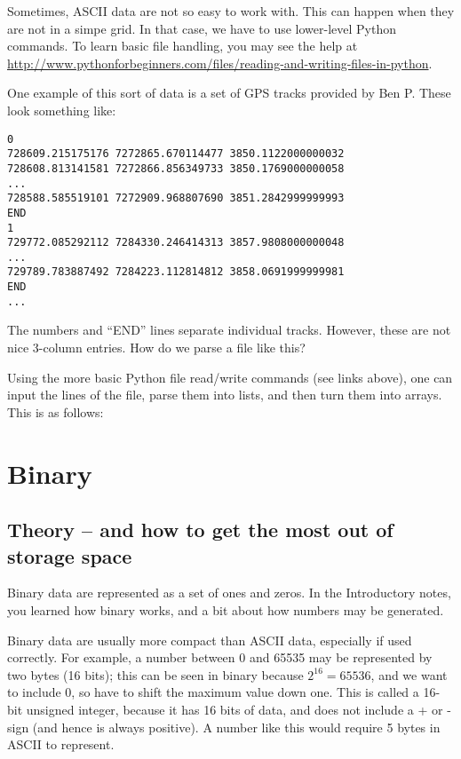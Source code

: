 \documentclass[a4paper,10pt]{scrartcl}
\begin{document}
Sometimes, ASCII data are not so easy to work with. This can happen when they are not in a simpe grid. In that case, we have to use lower-level Python commands. To learn basic file handling, you may see the help at \url{http://www.pythonforbeginners.com/files/reading-and-writing-files-in-python}.

One example of this sort of data is a set of GPS tracks provided by Ben P. These look something like:

\begin{lstlisting}
0
728609.215175176 7272865.670114477 3850.1122000000032
728608.813141581 7272866.856349733 3850.1769000000058
...
728588.585519101 7272909.968807690 3851.2842999999993
END
1
729772.085292112 7284330.246414313 3857.9808000000048
...
729789.783887492 7284223.112814812 3858.0691999999981
END
...
\end{lstlisting}

The numbers and ``END'' lines separate individual tracks. However, these are not nice 3-column entries. How do we parse a file like this?

Using the more basic Python file read/write commands (see links above), one can input the lines of the file, parse them into lists, and then turn them into arrays. This is as follows:



\section{Binary}

\subsection{Theory -- and how to get the most out of storage space}

Binary data are represented as a set of ones and zeros. In the Introductory notes, you learned how binary works, and a bit about how numbers may be generated.

Binary data are usually more compact than ASCII data, especially if used correctly. For example, a number between 0 and 65535 may be represented by two bytes (16 bits); this can be seen in binary because $2^16 = 65536$, and we want to include 0, so have to shift the maximum value down one. This is called a 16-bit unsigned integer, because it has 16 bits of data, and does not include a + or - sign (and hence is always positive). A number like this would require 5 bytes in ASCII to represent.
\end{document}
